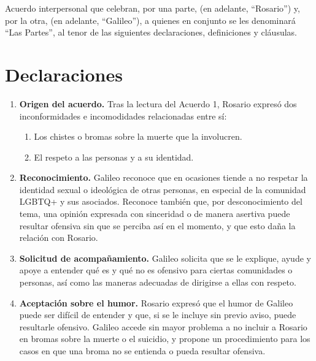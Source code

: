 
Acuerdo interpersonal que celebran, por una parte, \textbf{\ParteA} (en adelante, \enquote{Rosario}) y, por la otra, \textbf{\ParteB} (en adelante, \enquote{Galileo}), a quienes en conjunto se les denominará \enquote{Las Partes}, al tenor de las siguientes declaraciones, definiciones y cláusulas.

\section{Declaraciones}

\begin{enumerate}[label=\Roman*., leftmargin=*, itemsep=0.4em]
  \item \textbf{Origen del acuerdo.} Tras la lectura del Acuerdo 1, Rosario expresó dos inconformidades e incomodidades relacionadas entre sí:
  \begin{enumerate}[label=\alph*), itemsep=0.2em]
    \item Los chistes o bromas sobre la muerte que la involucren.
    \item El respeto a las personas y a su identidad.
  \end{enumerate}

  \item \textbf{Reconocimiento.} Galileo reconoce que en ocasiones tiende a no respetar la identidad sexual o ideológica de otras personas, en especial de la comunidad LGBTQ+ y sus asociados. Reconoce también que, por desconocimiento del tema, una opinión expresada con sinceridad o de manera asertiva puede resultar ofensiva sin que se perciba así en el momento, y que esto daña la relación con Rosario.

  \item \textbf{Solicitud de acompañamiento.} Galileo solicita que se le explique, ayude y apoye a entender qué es y qué no es ofensivo para ciertas comunidades o personas, así como las maneras adecuadas de dirigirse a ellas con respeto.

  \item \textbf{Aceptación sobre el humor.} Rosario expresó que el humor de Galileo puede ser difícil de entender y que, si se le incluye sin previo aviso, puede resultarle ofensivo. Galileo accede sin mayor problema a no incluir a Rosario en bromas sobre la muerte o el suicidio, y propone un procedimiento para los casos en que una broma no se entienda o pueda resultar ofensiva.


\end{enumerate}
